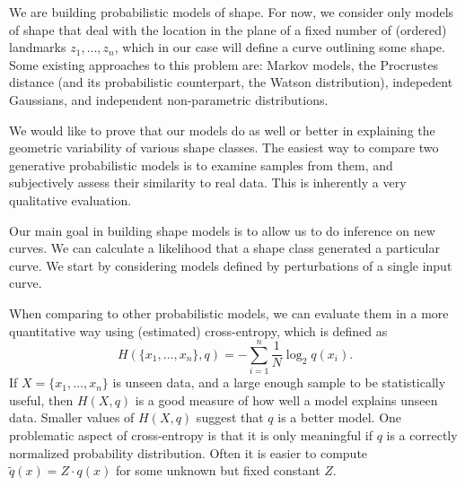 
We are building probabilistic models of shape. For now, we consider
only models of shape that deal with the location in the plane of a
fixed number of (ordered) landmarks $z_1, \dots, z_n$, which in
our case will define a curve outlining some shape. Some existing
approaches to this problem are: Markov models, the Procrustes distance
(and its probabilistic counterpart, the Watson distribution),
indepedent Gaussians, and independent non-parametric distributions.

We would like to prove that our models do as well or better in
explaining the geometric variability of various shape classes.
The easiest way to compare two generative probabilistic models is to
examine samples from them, and subjectively assess their similarity to
real data. This is inherently a very qualitative evaluation.

Our main goal in building shape models is to allow us to do inference
on new curves. We can calculate a likelihood that a shape class
generated a particular curve. We start by considering models defined
by perturbations of a single input curve.

When comparing to other probabilistic models, we can evaluate them in
a more quantitative way using (estimated) cross-entropy, which is
defined as
$$H(\{x_1,\dots,x_n\}, q) = - \sum_{i=1}^n \frac{1}{N} \log_2 q(x_i).$$
If $X = \{x_1,\dots,x_n\}$ is unseen data, and a large enough sample
to be statistically useful, then $H(X,q)$ is a good measure of how
well a model explains unseen data. Smaller values of $H(X,q)$ suggest
that $q$ is a better model. One problematic aspect of cross-entropy is
that it is only meaningful if $q$ is a correctly normalized
probability distribution. Often it is easier to compute
$\widetilde{q}(x) = Z\cdot q(x)$ for some unknown but fixed constant
$Z$.

